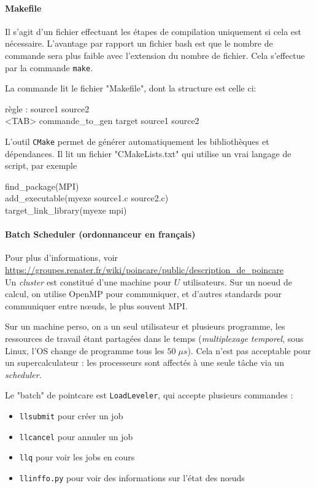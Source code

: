 \documentclass{article}
\begin{document}
\paragraph{Makefile}
Il s'agit d'un fichier effectuant les étapes de compilation uniquement si cela est nécessaire. L'avantage par rapport  un fichier bash est que le nombre de commande sera plus faible avec l'extension du nombre de fichier. Cela s'effectue par la commande \texttt{make}.

La commande lit le fichier "Makefile", dont la structure est celle ci:\\
\begin{algorithm}[H]
règle : source1 source2\\
<TAB> commande\_to\_gen target source1 source2\\
\end{algorithm}
L'outil \texttt{CMake} permet de générer automatiquement les bibliothèques et dépendances. Il lit un fichier "CMakeLists.txt" qui utilise un vrai langage de script, par exemple\\
\begin{algorithm}[H]
find\_package(MPI)\\
add\_executable(myexe source1.c source2.c)\\
target\_link\_library(myexe mpi)\\
\end{algorithm}

\paragraph{Batch Scheduler (ordonnanceur en français)}
Pour plus d'informations, voir \url{https://groupes.renater.fr/wiki/poincare/public/description_de_poincare}\\
Un \emph{cluster} est constitué d'une machine pour $U$ utilisateurs. Sur un noeud de calcul, on utilise OpenMP pour communiquer, et d'autres standards pour communiquer entre nœuds, le plus souvent MPI.

Sur un machine perso, on a un seul utilisateur et plusieurs programme, les ressources de travail étant partagées dans le temps (\emph{multiplexage temporel}, sous Linux, l'OS change de programme tous les $50\; \mu s$). Cela n'est pas acceptable pour un supercalculateur : les processeurs sont affectés à une seule tâche via un \emph{scheduler}.

Le "batch" de pointcare est \texttt{LoadLeveler}, qui accepte plusieurs commandes :
\begin{itemize}[label=\textbullet]
\item \texttt{llsubmit} pour créer un job
\item \texttt{llcancel} pour annuler un job
\item \texttt{llq} pour voir les jobs en cours
\item \texttt{llinffo.py} pour voir des informations sur l'état des nœuds
\end{itemize}
\end{document}
